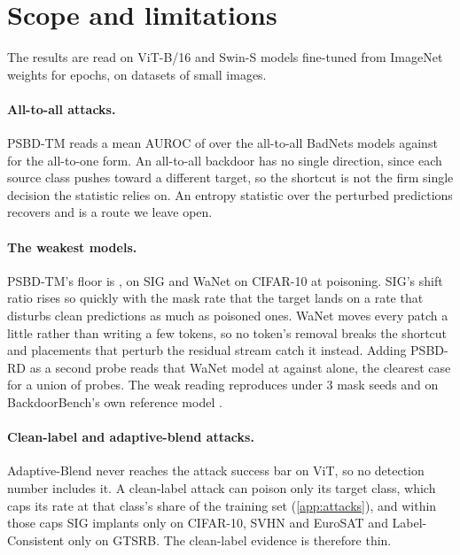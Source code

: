 \section{Scope and limitations}
\label{sec:limitations}

The results are read on \PanelCellsCached{} ViT-B/16 and \SwinCells{} Swin-S models fine-tuned from ImageNet weights for \TrainingEpochs{} epochs, on datasets of small images.

\paragraph{All-to-all attacks.}
PSBD-TM reads a mean AUROC of \ATwoaPsuAuroc{} over the \ATwoaCells{} all-to-all BadNets models against \ATwooPsuAuroc{} for the all-to-one form. An all-to-all backdoor has no single direction, since each source class pushes toward a different target, so the shortcut is not the firm single decision the statistic relies on. An entropy statistic over the perturbed predictions recovers \ATwoaEntropyAuroc{} and is a route we leave open.

\paragraph{The weakest models.}
PSBD-TM's floor is \HeadlineFloorAuroc{}, on SIG and WaNet on CIFAR-10 at \PanelRateHigh{} poisoning. SIG's shift ratio rises so quickly with the mask rate that the target lands on a rate that disturbs clean predictions as much as poisoned ones. WaNet moves every patch a little rather than writing a few tokens, so no token's removal breaks the shortcut and placements that perturb the residual stream catch it instead. Adding PSBD-RD as a second probe reads that WaNet model at \ProbeUnionWanetCifarOneZeroTmRd{} against \ProbeUnionWanetCifarOneZeroTm{} alone, the clearest case for a union of probes. The weak reading reproduces under 3 mask seeds and on BackdoorBench's own reference model \cite{wu2022backdoorbench}.

\paragraph{Clean-label and adaptive-blend attacks.}
Adaptive-Blend never reaches the attack success bar on ViT, so no detection number includes it. A clean-label attack can poison only its target class, which caps its rate at that class's share of the training set (\cref{app:attacks}), and within those caps SIG implants only on CIFAR-10, SVHN and EuroSAT and Label-Consistent only on GTSRB. The clean-label evidence is therefore thin.

